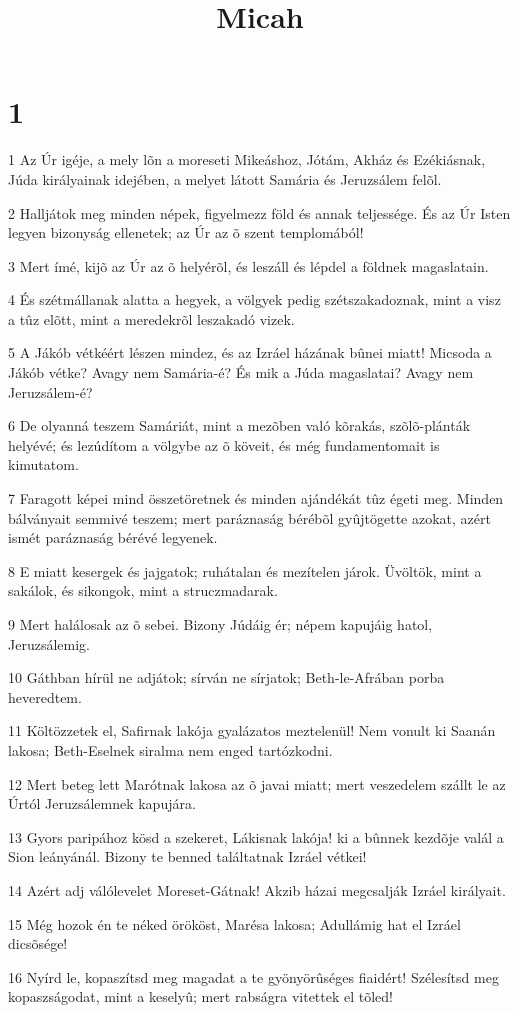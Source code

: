 

\title{Micah}


\chapter{1}

\par 1 Az Úr igéje, a mely lõn a moreseti Mikeáshoz, Jótám, Akház és Ezékiásnak, Júda királyainak idejében, a melyet látott Samária és Jeruzsálem felõl.
\par 2 Halljátok meg minden népek, figyelmezz föld és annak teljessége. És az Úr Isten legyen bizonyság ellenetek; az Úr az õ szent templomából!
\par 3 Mert ímé, kijõ az Úr az õ helyérõl, és leszáll és lépdel a földnek magaslatain.
\par 4 És szétmállanak alatta a hegyek, a völgyek pedig szétszakadoznak, mint a visz a tûz elõtt, mint a meredekrõl leszakadó vizek.
\par 5 A Jákób vétkéért lészen mindez, és az Izráel házának bûnei miatt! Micsoda a Jákób vétke? Avagy nem Samária-é? És mik a Júda magaslatai? Avagy nem Jeruzsálem-é?
\par 6 De olyanná teszem Samáriát, mint a mezõben való kõrakás, szõlõ-plánták helyévé; és lezúdítom a völgybe az õ köveit, és még fundamentomait is kimutatom.
\par 7 Faragott képei mind összetöretnek és minden ajándékát tûz égeti meg. Minden bálványait semmivé teszem; mert paráznaság bérébõl gyûjtögette azokat, azért ismét paráznaság bérévé legyenek.
\par 8 E miatt kesergek és jajgatok; ruhátalan és mezítelen járok. Üvöltök, mint a sakálok, és sikongok, mint a struczmadarak.
\par 9 Mert halálosak az õ sebei. Bizony Júdáig ér; népem kapujáig hatol, Jeruzsálemig.
\par 10 Gáthban hírül ne adjátok; sírván ne sírjatok; Beth-le-Afrában porba heveredtem.
\par 11 Költözzetek el, Safirnak lakója gyalázatos meztelenül! Nem vonult ki Saanán lakosa; Beth-Eselnek siralma nem enged tartózkodni.
\par 12 Mert beteg lett Marótnak lakosa az õ javai miatt; mert veszedelem szállt le az Úrtól Jeruzsálemnek kapujára.
\par 13 Gyors paripához kösd a szekeret, Lákisnak lakója! ki a bûnnek kezdõje valál a Sion leányánál. Bizony te benned találtatnak Izráel vétkei!
\par 14 Azért adj válólevelet Moreset-Gátnak! Akzib házai megcsalják Izráel királyait.
\par 15 Még hozok én te néked örököst, Marésa lakosa; Adullámig hat el Izráel dicsõsége!
\par 16 Nyírd le, kopaszítsd meg magadat a te gyönyörûséges fiaidért! Szélesítsd meg kopaszságodat, mint a keselyû; mert rabságra vitettek el tõled!

